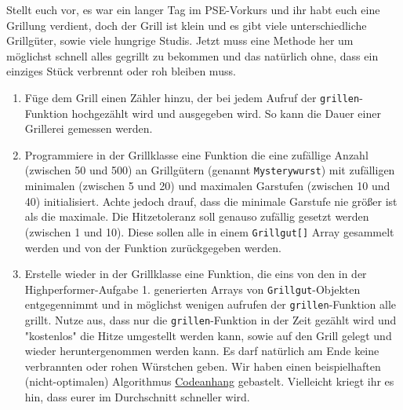 \documentclass{../../sheet}
\begin{document}
\newpage
{}
Stellt euch vor, es war ein langer Tag im PSE-Vorkurs und ihr habt euch eine Grillung verdient, doch der Grill ist klein und es gibt viele unterschiedliche Grillgüter, sowie viele hungrige Studis. Jetzt muss eine Methode her um möglichst schnell alles gegrillt zu bekommen und das natürlich ohne, dass ein einziges Stück verbrennt oder roh bleiben muss.
\begin{enumerate}
    \item Füge dem Grill einen Zähler hinzu, der bei jedem Aufruf der \texttt{grillen}-Funktion hochgezählt wird und ausgegeben wird. So kann die Dauer einer Grillerei gemessen werden.
    \item Programmiere in der Grillklasse eine Funktion die eine zufällige Anzahl (zwischen 50 und 500) an Grillgütern (genannt \texttt{Mysterywurst}) mit zufälligen minimalen (zwischen 5 und 20) und maximalen Garstufen (zwischen 10 und 40) initialisiert. Achte jedoch drauf, dass die minimale Garstufe nie größer ist als die maximale. Die Hitzetoleranz soll genauso zufällig gesetzt werden (zwischen 1 und 10). Diese sollen alle in einem \texttt{Grillgut[]} Array gesammelt werden und von der Funktion zurückgegeben werden. 
    \item Erstelle wieder in der Grillklasse eine Funktion, die eins von den in der Highperformer-Aufgabe 1. generierten Arrays von \texttt{Grillgut}-Objekten entgegennimmt und in möglichst wenigen aufrufen der \texttt{grillen}-Funktion alle grillt. Nutze aus, dass nur die \texttt{grillen}-Funktion in der Zeit gezählt wird und "kostenlos" die Hitze umgestellt werden kann, sowie auf den Grill gelegt und wieder heruntergenommen werden kann. Es darf natürlich am Ende keine verbrannten oder rohen Würstchen geben. Wir haben einen beispielhaften (nicht-optimalen) Algorithmus \hyperlink{Codeanhang1}{Codeanhang} gebastelt. Vielleicht kriegt ihr es hin, dass eurer im Durchschnitt schneller wird.
\end{enumerate}
\end{document}
